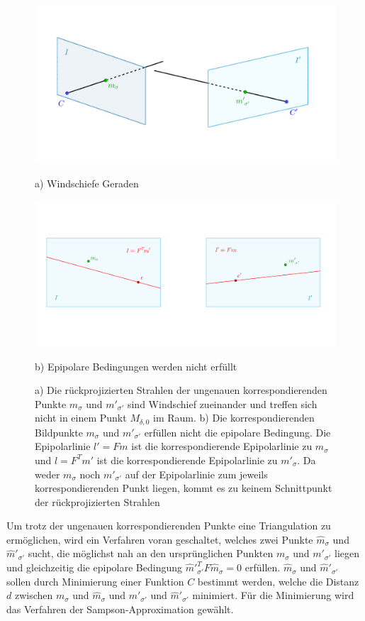 \begin{figure}[!htb]
	\includegraphics[width=\linewidth]{images/problemTriangulation_beschriftet.png}
	\caption[Windschiefe Geraden]{a) Windschiefe Geraden}
	\label{fig:ProblemTraingulation}
	\endminipage\hfill
	\includegraphics[width=\linewidth]{images/SampsAppx.png}
	\caption[Epipolare Bedingung wird nicht erfüllt]{b) Epipolare Bedingungen werden nicht erfüllt}
	\label{fig:lFm}
	\endminipage\hfill
	\caption[Problemstellung für die Triangulation im reellen Beispiel]{ a) Die rückprojizierten Strahlen der ungenauen korrespondierenden Punkte $m_\sigma$ und $m'_{\sigma'}$ sind Windschief zueinander und treffen sich nicht in einem Punkt $M_{\delta,0}$ im Raum. b) Die korrespondierenden Bildpunkte $m_\sigma$ und $m'_{\sigma'}$ erfüllen nicht die epipolare Bedingung. Die Epipolarlinie $l' = Fm$ ist die korrespondierende Epipolarlinie zu $m_\sigma$ und $l = F^Tm'$ ist die korrespondierende Epipolarlinie zu $m'_{\sigma}$. Da weder $m_\sigma$ noch $m'_{\sigma'}$ auf der Epipolarlinie zum jeweils korrespondierenden Punkt liegen, kommt es zu keinem Schnittpunkt der rückprojizierten Strahlen}
\end{figure}

Um trotz der ungenauen korrespondierenden Punkte eine Triangulation zu ermöglichen, wird ein Verfahren voran geschaltet, welches zwei Punkte $\hat{m}_\sigma$ und $\hat{m}'_{\sigma'}$ sucht, die möglichst nah an den ursprünglichen Punkten $m_\sigma$ und $m'_{\sigma'}$ liegen und gleichzeitig die epipolare Bedingung $\hat{m}'^T_{\sigma'}F\hat{m}_\sigma = 0$ erfüllen. $\hat{m}_\sigma$ und $\hat{m}'_{\sigma'}$ sollen durch Minimierung einer Funktion $C$ bestimmt werden, welche die Distanz  $d$ zwischen $m_\sigma$ und $\hat{m}_\sigma$ und $m'_{\sigma'}$ und $\hat{m}'_{\sigma'}$ minimiert. Für die Minimierung wird das Verfahren der Sampson-Approximation gewählt\cite{HZ}. 

